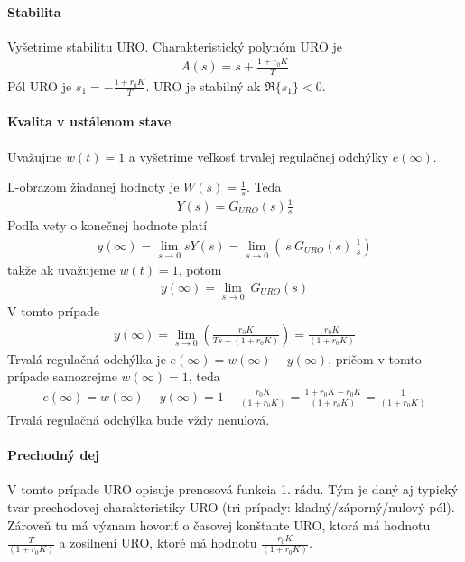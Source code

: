 \documentclass[a4paper, 10pt, ]{article}
\begin{document}
\paragraph{Stabilita}
Vyšetrime stabilitu URO. Charakteristický polynóm URO je
\begin{align}
    A(s) = s + \frac{1 + r_0 K}{T}
\end{align}
Pól URO je $s_1 = - \frac{1 + r_0 K}{T}$. URO je stabilný ak $\Re\{ s_1 \} < 0$.




\paragraph{Kvalita v ustálenom stave}
Uvažujme $w(t) = 1$ a vyšetrime veľkosť trvalej regulačnej odchýlky $e(\infty)$.

L-obrazom žiadanej hodnoty je $W(s) = \frac{1}{s}$. Teda
\begin{align}
    Y(s) = G_{URO}(s) \frac{1}{s}
\end{align}
Podľa vety o konečnej hodnote platí
\begin{align}
    y(\infty) = \lim_{s\to 0} s Y(s) = \lim_{s\to 0} \left( \ s \ G_{URO}(s) \ \frac{1}{s} \right)
\end{align}
takže ak uvažujeme $w(t) = 1$, potom
\begin{align}
    y(\infty) =  \lim_{s\to 0} \ G_{URO}(s)
\end{align}
V tomto prípade
\begin{align}
    y(\infty)
    =  \lim_{s\to 0} \left(  \frac{r_0 K}{Ts+ (1 + r_0 K)} \right)
    =  \frac{r_0 K}{(1 + r_0 K)}
\end{align}
Trvalá regulačná odchýlka je $e(\infty) = w(\infty) - y(\infty)$, pričom v tomto prípade samozrejme $ w(\infty) = 1$, teda
\begin{align}
    e(\infty)
    = w(\infty) - y(\infty)
    = 1 -  \frac{r_0 K}{(1 + r_0 K)}
    =\frac{1 + r_0 K - r_0 K}{(1 + r_0 K)}
    =\frac{1}{(1 + r_0 K)}
\end{align}
Trvalá regulačná odchýlka bude vždy nenulová.




\paragraph{Prechodný dej}
V tomto prípade URO opisuje prenosová funkcia 1. rádu. Tým je daný aj typický tvar prechodovej charakteristiky URO (tri prípady: kladný/záporný/nulový pól). Zároveň tu má význam hovoriť o časovej konštante URO, ktorá má hodnotu $\frac{T}{(1 + r_0 K)}$ a zosilnení URO, ktoré má hodnotu $\frac{r_0 K}{(1 + r_0 K)}$.
\end{document}
